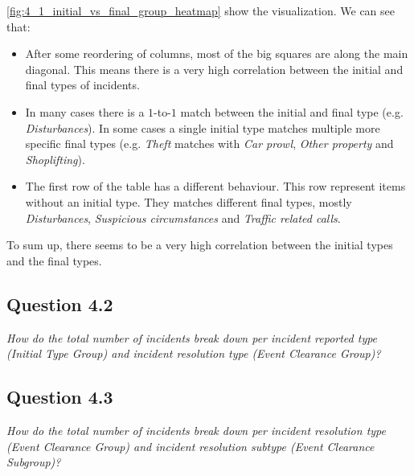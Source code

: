 \cref{fig:4_1_initial_vs_final_group_heatmap} show the visualization.
We can see that:
\begin{itemize}
    \item After some reordering of columns, most of the big squares are along the main diagonal. This means there is a very high correlation between the initial and final types of incidents.
    \item In many cases there is a $1$-to-$1$ match between the initial and final type (e.g. \textit{Disturbances}). In some cases a single initial type matches multiple more specific final types (e.g. \textit{Theft} matches with \textit{Car prowl}, \textit{Other property} and \textit{Shoplifting}).
    \item The first row of the table has a different behaviour. This row represent items without an initial type. They matches different final types, mostly \textit{Disturbances}, \textit{Suspicious circumstances} and \textit{Traffic related calls}.
\end{itemize}

To sum up, there seems to be a very high correlation between the initial types and the final types.

\subsection*{Question 4.2}
\textit{How do the total number of incidents break down per incident reported type (Initial Type Group) and incident resolution type (Event Clearance Group)?}


\subsection*{Question 4.3}
\textit{How do the total number of incidents break down per incident resolution type (Event Clearance Group) and incident resolution subtype (Event Clearance Subgroup)?}
